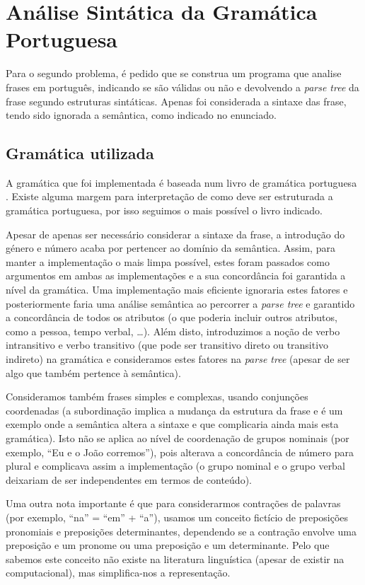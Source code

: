 \documentclass[12pt,a4paper,oneside]{article}
\begin{document}
\section{Análise Sintática da Gramática Portuguesa}
\label{sec:sin}

Para o segundo problema, é pedido que se construa um programa que
analise frases em português, indicando se são válidas ou não e
devolvendo a \textit{parse tree} da frase segundo estruturas
sintáticas. Apenas foi considerada a sintaxe das frase, tendo sido
ignorada a semântica, como indicado no enunciado.
 
\subsection{Gramática utilizada}

A gramática que foi implementada é baseada num livro de gramática
portuguesa \cite{arezedo:2013}. Existe alguma margem para interpretação
de como deve ser estruturada a gramática portuguesa, por isso seguimos
o mais possível o livro indicado.

Apesar de apenas ser necessário considerar a sintaxe da frase, a
introdução do género e número acaba por pertencer ao domínio da
semântica. Assim, para manter a implementação o mais limpa possível,
estes foram passados como argumentos em ambas as implementações e a
sua concordância foi garantida a nível da gramática. Uma implementação
mais eficiente ignoraria estes fatores e posteriormente faria uma
análise semântica ao percorrer a \textit{parse tree} e garantido a
concordância de todos os atributos (o que poderia incluir outros
atributos, como a pessoa, tempo verbal, \ldots). Além disto,
introduzimos a noção de verbo intransitivo e verbo transitivo (que
pode ser transitivo direto ou transitivo indireto) na gramática e
consideramos estes fatores na \textit{parse tree} (apesar de ser algo
que também pertence à semântica).

Consideramos também frases simples e complexas, usando conjunções
coordenadas (a subordinação implica a mudança da estrutura da frase e
é um exemplo onde a semântica altera a sintaxe e que complicaria ainda
mais esta gramática). Isto não se aplica ao nível de coordenação de
grupos nominais (por exemplo, ``Eu e o João corremos''), pois alterava
a concordância de número para plural e complicava assim a
implementação (o grupo nominal e o grupo verbal deixariam de ser
independentes em termos de conteúdo).

Uma outra nota importante é que para considerarmos contrações de
palavras (por exemplo, ``na'' = ``em'' + ``a''), usamos um conceito
fictício de preposições pronomiais e preposições determinantes,
dependendo se a contração envolve uma preposição e um pronome ou uma
preposição e um determinante. Pelo que sabemos este conceito não
existe na literatura linguística (apesar de existir na computacional),
mas simplifica-nos a representação.
\end{document}

